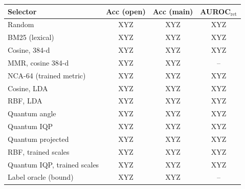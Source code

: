 \begin{tabular}{@{}l cc c@{}}
\toprule
Selector & Acc (open) & Acc (main) & AUROC$_\mathrm{ret}$ \\
\midrule
Random & XYZ & XYZ & XYZ \\
BM25 (lexical) & XYZ & XYZ & XYZ \\
Cosine, 384-d & XYZ & XYZ & XYZ \\
MMR, cosine 384-d & XYZ & XYZ & -- \\
NCA-64 (trained metric) & XYZ & XYZ & XYZ \\
\midrule
Cosine, LDA & XYZ & XYZ & XYZ \\
RBF, LDA & XYZ & XYZ & XYZ \\
Quantum angle & XYZ & XYZ & XYZ \\
Quantum IQP & XYZ & XYZ & XYZ \\
Quantum projected & XYZ & XYZ & XYZ \\
RBF, trained scales & XYZ & XYZ & XYZ \\
Quantum IQP, trained scales & XYZ & XYZ & XYZ \\
\midrule
Label oracle (bound) & XYZ & XYZ & -- \\
\bottomrule
\end{tabular}
